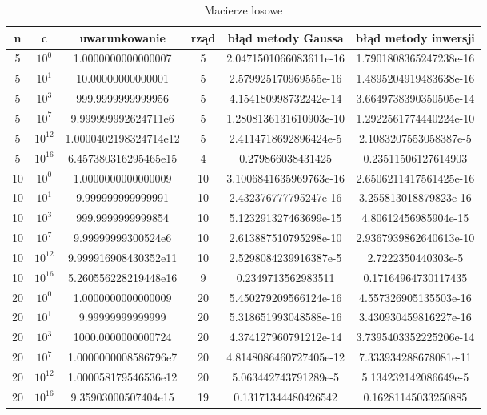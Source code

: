 \documentclass[15pt, a4paper]{article}
\begin{document}
\begin{table}[ht]
    \begin{adjustbox}{max width=\textwidth}
    \begin{tabular}{|c|c|c|c|c|c|}
        \hline 
        n & c & uwarunkowanie & rząd & błąd metody Gaussa & błąd metody inwersji \\ \hline
        5 & $10^0$ & 1.0000000000000007 & 5 & 2.0471501066083611e-16 & 1.7901808365247238e-16 \\ \hline
        5 & $10^1$ & 10.00000000000001 & 5 & 2.579925170969555e-16 & 1.4895204919483638e-16 \\ \hline
        5 & $10^3$ & 999.9999999999956 & 5 & 4.154180998732242e-14 & 3.6649738390350505e-14 \\ \hline
        5 & $10^7$ & 9.999999992624711e6 & 5 & 1.2808136131610903e-10 & 1.2922561774440224e-10 \\ \hline
        5 & $10^{12}$ & 1.0000402198324714e12 & 5 & 2.4114718692896424e-5 & 2.1083207553058387e-5 \\ \hline
        5 & $10^{16}$ & 6.457380316295465e15 & 4 & 0.279866038431425 & 0.23511506127614903 \\ \hline
        10 & $10^0$ & 1.0000000000000009 & 10 & 3.1006841635969763e-16 & 2.6506211417561425e-16 \\ \hline
        10 & $10^1$ & 9.999999999999991 & 10 & 2.432376777795247e-16 & 3.255813018879823e-16 \\ \hline
        10 & $10^3$ & 999.9999999999854 & 10 & 5.123291327463699e-15 & 4.80612456985904e-15 \\ \hline
        10 & $10^7$ & 9.99999999300524e6 & 10 & 2.613887510795298e-10 & 2.9367939862640613e-10 \\ \hline
        10 & $10^{12}$ & 9.999916908430352e11 & 10 & 2.5298084239916387e-5 & 2.7222350440303e-5 \\ \hline
        10 & $10^{16}$ & 5.260556228219448e16 & 9 & 0.2349713562983511 & 0.17164964730117435 \\ \hline
        20 & $10^0$ & 1.0000000000000009 & 20 & 5.450279209566124e-16 & 4.557326905135503e-16 \\ \hline
        20 & $10^1$ & 9.99999999999999 & 20 & 5.318651993048588e-16 & 3.430930459816227e-16 \\ \hline
        20 & $10^3$ & 1000.0000000000724 & 20 & 4.374127960791212e-14 & 3.7395403352225206e-14 \\ \hline
        20 & $10^7$ & 1.0000000008586796e7 & 20 & 4.8148086460727405e-12 & 7.333934288678081e-11 \\ \hline
        20 & $10^{12}$ & 1.000058179546536e12 & 20 & 5.063442743791289e-5 & 5.134232142086649e-5 \\ \hline
        20 & $10^{16}$ & 9.35903000507404e15 & 19 & 0.13171344480426542 & 0.16281145033250885 \\ \hline
    \end{tabular}
    \end{adjustbox}
    \caption{Macierze losowe}
    \label{tab:inversion}
\end{table}
\end{document}
